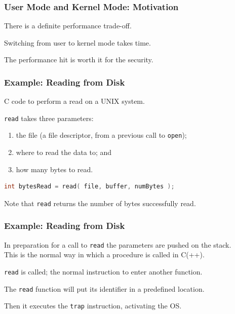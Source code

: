 \begin{frame}
\frametitle{User Mode and Kernel Mode: Motivation}

There is a definite performance trade-off.

Switching from user to kernel mode takes time.

The performance hit is worth it for the security.

\end{frame}

\begin{frame}[fragile]
\frametitle{Example: Reading from Disk}
C code to perform a read on a UNIX system.

\texttt{read} takes three parameters: 
\begin{enumerate}
	\item the file (a file descriptor, from a previous call 
to \texttt{open}); 
	\item where to read the data to; and
	\item how many bytes to read.
\end{enumerate} 

\begin{lstlisting}[language=C]
int bytesRead = read( file, buffer, numBytes );
\end{lstlisting}

Note that \texttt{read} returns the number of bytes successfully read.

\end{frame}


\begin{frame}
\frametitle{Example: Reading from Disk}

In preparation for a call to \texttt{read} the parameters are pushed on the stack.\\
\quad This is the normal way in which a procedure is called in C(++). 

\texttt{read} is called; the normal instruction to enter another function.

The \texttt{read} function will put its identifier in a predefined location.

Then it executes the \texttt{trap} instruction, activating the OS.

\end{frame}


